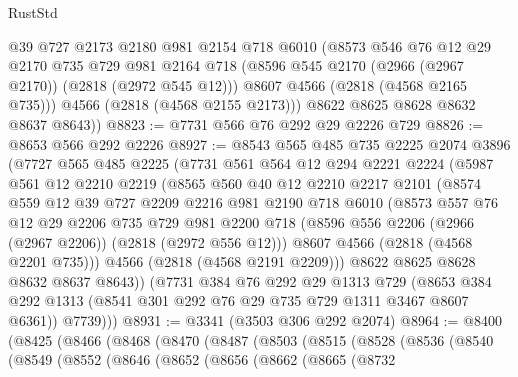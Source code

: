 \begin{lexlean}{RustStd}
\begin{coremodule}
          @39
          @727
          @2173
          @2180
          @981
          @2154
          @718
          @6010
          (@8573
            @546
            @76
            @12
            @29
            @2170
            @735
            @729
            @981
            @2164
            @718
            (@8596 @545 @2170 (@2966 (@2967 @2170)) (@2818 (@2972 @545 @12)))
            @8607
            @4566
            (@2818 (@4568 @2165 @735)))
          @4566
          (@2818 (@4568 @2155 @2173)))
        @8622
        @8625
        @8628
        @8632
        @8637
        @8643))
@8823 := @7731 @566 @76 @292 @29 @2226 @729
@8826 := @8653 @566 @292 @2226
@8927 := @8543
    @565
    @485
    @735
    @2225
    @2074
    @3896
    (@7727
      @565
      @485
      @2225
      (@7731
        @561
        @564
        @12
        @294
        @2221
        @2224
        (@5987
          @561
          @12
          @2210
          @2219
          (@8565
            @560
            @40
            @12
            @2210
            @2217
            @2101
            (@8574
              @559
              @12
              @39
              @727
              @2209
              @2216
              @981
              @2190
              @718
              @6010
              (@8573
                @557
                @76
                @12
                @29
                @2206
                @735
                @729
                @981
                @2200
                @718
                (@8596 @556 @2206 (@2966 (@2967 @2206)) (@2818 (@2972 @556 @12)))
                @8607
                @4566
                (@2818 (@4568 @2201 @735)))
              @4566
              (@2818 (@4568 @2191 @2209)))
            @8622
            @8625
            @8628
            @8632
            @8637
            @8643))
        (@7731
          @384
          @76
          @292
          @29
          @1313
          @729
          (@8653 @384 @292 @1313 (@8541 @301 @292 @76 @29 @735 @729 @1311 @3467 @8607 @6361))
          @7739)))
@8931 := @3341 (@3503 @306 @292 @2074)
@8964 := @8400
    (@8425
      (@8466
        (@8468
          (@8470
            (@8487
              (@8503
                (@8515
                  (@8528
                    (@8536
                      (@8540
                        (@8549
                          (@8552
                            (@8646
                              (@8652
                                (@8656
                                  (@8662
                                    (@8665
                                      (@8732

\end{coremodule}
\end{lexlean}
